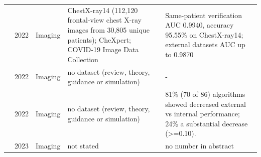 \begin{longtable}{@{}p{2.6cm}p{0.7cm}p{1.2cm}p{4.4cm}p{4.6cm}@{}}
\cite{packhauser2022deep} & 2022 & Imaging & ChestX-ray14 (112,120 frontal-view chest X-ray images from 30,805 unique patients); CheXpert; COVID-19 Image Data Collection & Same-patient verification AUC 0.9940, accuracy 95.55\% on ChestX-ray14; external datasets AUC up to 0.9870\\
\cite{varoquaux2022machine} & 2022 & Imaging & no dataset (review, theory, guidance or simulation) & -\\
\cite{yu2022external} & 2022 & Imaging & no dataset (review, theory, guidance or simulation) & 81\% (70 of 86) algorithms showed decreased external vs internal performance; 24\% a substantial decrease (>=0.10).\\
\cite{hatamizadeh2023do} & 2023 & Imaging & not stated & no number in abstract\\
\bottomrule
\end{longtable}

